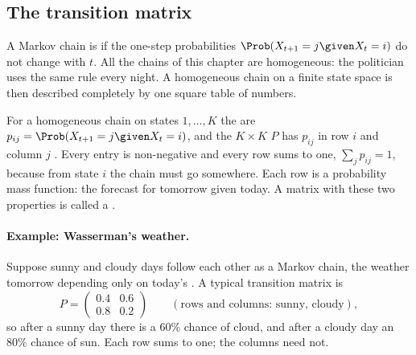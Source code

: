 \subsection{The transition matrix}
\label{9a:sec:transition}

A Markov chain is  if the one-step probabilities
$\Prob(X_{t+1}=j\given X_t=i)$ do not change with $t$. All the chains of this chapter are
homogeneous: the politician uses the same rule every night. A homogeneous chain on a finite
state space is then described completely by one square table of numbers.

\begin{workdef}
For a homogeneous chain on states $1,\dots,K$ the  are
$p_{ij}=\Prob(X_{t+1}=j\given X_t=i)$, and the $K\times K$  $P$ has
$p_{ij}$ in row $i$  and column $j$ . Every entry is non-negative and every row sums to one,
$\sum_jp_{ij}=1$, because from state $i$ the chain must go somewhere. Each row is a
probability mass function: the forecast for tomorrow given today. A matrix with these two
properties is called a .
\end{workdef}

\paragraph{Example: Wasserman's weather.}
Suppose sunny and cloudy days follow each other as a Markov chain, the weather tomorrow
depending only on today's . A typical transition matrix is
\begin{equation}
  P=\begin{pmatrix}0.4&0.6\\0.8&0.2\end{pmatrix}
  \qquad(\text{rows and columns: sunny, cloudy}),
  \label{9a:eq:weather2}
\end{equation}
so after a sunny day there is a 60\% chance of cloud, and after a cloudy day an 80\% chance of
sun. Each row sums to one; the columns need not.

